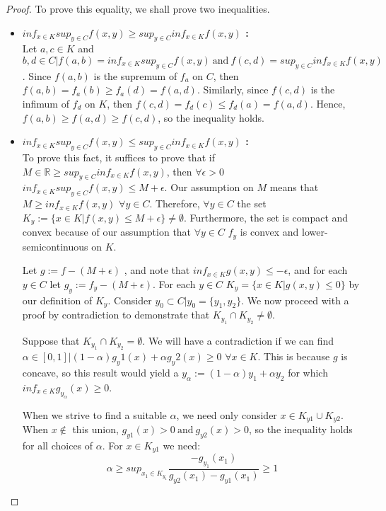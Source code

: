 \documentclass[12pt]{article}
\theoremstyle{definition}
\theoremstyle{remark}
\begin{document}
\begin{proof}
To prove this equality, we shall prove two inequalities.
\begin{itemize}
	\item{\textbf{$inf_{x \in K} sup_{y \in C} f(x,y) \geq sup_{y \in C} inf_{x \in K} f(x,y)$ :}\\ Let $a,c \in K$ and $b,d \in C | f(a,b) = inf_{x \in K} sup_{y \in C} f(x,y)\ \textrm{and}\ f(c,d) = sup_{y \in C} inf_{x \in K} f(x,y)$.
		Since $f(a,b)$ is the supremum of $f_a$ on $C$, then $f(a,b) = f_a(b) \geq f_a(d) = f(a,d)$.
		Similarly, since $f(c,d)$ is the infimum of $f_d$ on $K$, then $f(c,d) = f_d(c) \leq f_d(a) = f(a,d)$.
		Hence, $f(a,b) \geq f(a,d) \geq f(c,d)$, so the inequality holds.
	}
	\item{\textbf{$inf_{x \in K} sup_{y \in C} f(x,y) \leq sup_{y \in C} inf_{x \in K} f(x,y)$ :}\\ To prove this fact, it suffices to prove that if $M \in \mathbb{R} \geq sup_{y \in C} inf_{x \in K} f(x,y)$, then $\forall \epsilon > 0$ $inf_{x \in K} sup_{y \in C} f(x,y) \leq M + \epsilon$.
		Our assumption on $M$ means that $M \geq inf_{x \in K} f(x,y)$ $\forall y \in C$. Therefore, $\forall y \in C$ the set $K_y := \{x \in K | f(x,y) \leq M + \epsilon\} \neq \emptyset$. Furthermore, the set is compact and convex because of our assumption that $\forall y \in C$
		$f_y$ is convex and lower-semicontinuous on $K$.

		Let $g := f - (M + \epsilon)$ , and note that $inf_{x \in K} g(x,y) \leq -\epsilon$, and for each $y \in C$ let $g_y := f_y - (M + \epsilon)$.
		For each $y \in C$ $K_y = \{x \in K | g(x,y) \leq 0\}$ by our definition of $K_y$. Consider $y_0 \subset C | y_0 = \{y_1,y_2\}$. We now proceed with a proof by contradiction to demonstrate that $K_{y_1} \cap K_{y_2} \neq \emptyset$.

		Suppose that $K_{y_1} \cap K_{y_2} = \emptyset$. We will have a contradiction if we can find $\alpha \in [0,1] | (1-\alpha)g_y1(x) + \alpha g_y2(x) \geq 0$ $\forall x \in K$. This is because $g$ is concave, so this result would yield a $y_\alpha := (1-\alpha)y_1 + \alpha y_2$ for which
		$inf_{x \in K} g_{y_\alpha}(x) \geq 0$.

		When we strive to find a suitable $\alpha$, we need only consider $x \in K_{y1} \cup K_{y2}$. When $x \notin$ this union, $g_{y1}(x) > 0\ \textrm{and}\ g_{y2}(x) > 0$, so the inequality holds for all choices of $\alpha$. For $x \in K_{y1}$ we need:
		\[
			\alpha \geq sup_{x_1 \in K_{y_1}} \frac{-g_{y_1}(x_1)}{g_{y2}(x_1) - g_{y1}(x_1)} \geq 1
		\]
	
}
\end{itemize}
\end{proof}
\end{document}
